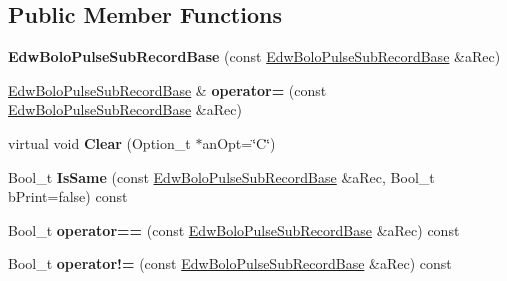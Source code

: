 \subsection*{Public Member Functions}
\begin{DoxyCompactItemize}
\item 
\hypertarget{class_edw_bolo_pulse_sub_record_base_a4ace3bfc1a7117dd95dfe2b34f890e94}{
{\bfseries EdwBoloPulseSubRecordBase} (const \hyperlink{class_edw_bolo_pulse_sub_record_base}{EdwBoloPulseSubRecordBase} \&aRec)}
\label{class_edw_bolo_pulse_sub_record_base_a4ace3bfc1a7117dd95dfe2b34f890e94}

\item 
\hypertarget{class_edw_bolo_pulse_sub_record_base_ad3d0e13e04e4144263445cf144058c77}{
\hyperlink{class_edw_bolo_pulse_sub_record_base}{EdwBoloPulseSubRecordBase} \& {\bfseries operator=} (const \hyperlink{class_edw_bolo_pulse_sub_record_base}{EdwBoloPulseSubRecordBase} \&aRec)}
\label{class_edw_bolo_pulse_sub_record_base_ad3d0e13e04e4144263445cf144058c77}

\item 
\hypertarget{class_edw_bolo_pulse_sub_record_base_aab2b6c7bbae68a8fc419b856a2673162}{
virtual void {\bfseries Clear} (Option\_\-t $\ast$anOpt=\char`\"{}C\char`\"{})}
\label{class_edw_bolo_pulse_sub_record_base_aab2b6c7bbae68a8fc419b856a2673162}

\item 
\hypertarget{class_edw_bolo_pulse_sub_record_base_a73fc5c22c1e7ecb2ce3928a232664683}{
Bool\_\-t {\bfseries IsSame} (const \hyperlink{class_edw_bolo_pulse_sub_record_base}{EdwBoloPulseSubRecordBase} \&aRec, Bool\_\-t bPrint=false) const }
\label{class_edw_bolo_pulse_sub_record_base_a73fc5c22c1e7ecb2ce3928a232664683}

\item 
\hypertarget{class_edw_bolo_pulse_sub_record_base_a70544cb710db1ae95d148f620e111e9b}{
Bool\_\-t {\bfseries operator==} (const \hyperlink{class_edw_bolo_pulse_sub_record_base}{EdwBoloPulseSubRecordBase} \&aRec) const }
\label{class_edw_bolo_pulse_sub_record_base_a70544cb710db1ae95d148f620e111e9b}

\item 
\hypertarget{class_edw_bolo_pulse_sub_record_base_ad412a68a6c828274eb9ca8fd2c1facd6}{
Bool\_\-t {\bfseries operator!=} (const \hyperlink{class_edw_bolo_pulse_sub_record_base}{EdwBoloPulseSubRecordBase} \&aRec) const }
\label{class_edw_bolo_pulse_sub_record_base_ad412a68a6c828274eb9ca8fd2c1facd6}


\end{DoxyCompactItemize}
